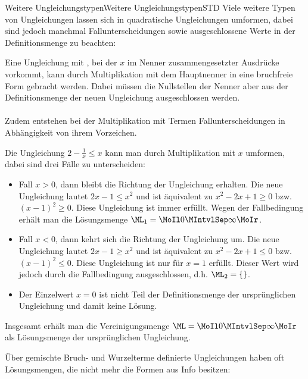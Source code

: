 \begin{MXContent}{Weitere Ungleichungstypen}{Weitere Ungleichungstypen}{STD}
Viele weitere Typen von Ungleichungen lassen sich in quadratische Ungleichungen umformen,
dabei sind jedoch manchmal Fallunterscheidungen sowie ausgeschlossene Werte in der Definitionsmenge zu beachten:

\begin{MInfo}
Eine Ungleichung mit , bei der $x$ im Nenner zusammengesetzter Ausdrücke vorkommt, kann durch Multiplikation mit dem Hauptnenner
in eine bruchfreie Form gebracht werden. Dabei müssen die Nullstellen der Nenner aber aus der Definitionsmenge der neuen
Ungleichung ausgeschlossen werden.
\ \\ \ \\
Zudem entstehen bei der Multiplikation mit Termen Fallunterscheidungen in Abhängigkeit von ihrem Vorzeichen.
\end{MInfo}

\begin{MExample}
Die Ungleichung $2-\frac1x\leq x$ kann man durch Multiplikation mit $x$ umformen, dabei sind drei Fälle zu unterscheiden:
\begin{itemize}
\item{Fall $x>0$, dann bleibt die Richtung der Ungleichung erhalten. Die neue Ungleichung lautet $2x-1\leq x^2$ und ist äquivalent zu $x^2-2x+1\geq 0$ bzw. $(x-1)^2\geq 0$. Diese Ungleichung ist immer erfüllt.
Wegen der Fallbedingung erhält man die Lösungsmenge $\ML_1=\MoIl 0\MIntvlSep \infty\MoIr$.}
\item{Fall $x<0$, dann kehrt sich die Richtung der Ungleichung um. Die neue Ungleichung lautet $2x-1\geq x^2$ und ist äquivalent zu $x^2-2x+1\leq 0$ bzw. $(x-1)^2\leq 0$.
Diese Ungleichung ist nur für $x=1$ erfüllt. Dieser Wert wird jedoch durch die Fallbedingung ausgeschlossen, d.h. $\ML_2=\{\}$.}
\item{Der Einzelwert $x=0$ ist nicht Teil der Definitionsmenge der ursprünglichen Ungleichung und damit keine Lösung.}
\end{itemize}
Insgesamt erhält man die Vereinigungsmenge $\ML=\MoIl 0\MIntvlSep \infty\MoIr$ als Lösungsmenge der ursprünglichen Ungleichung.
\end{MExample}

Über gemischte Bruch- und Wurzelterme definierte Ungleichungen haben oft Lösungsmengen, die nicht mehr die Formen aus Info  besitzen:


\end{MXContent}
